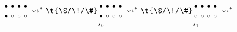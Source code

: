 \begin{primjer}
\begin{multline}
{\begin{array}{@{}c@{}}
    \text\textbullet\\
    \text\textbullet
    \end{array}}
    \begin{array}{@{}c@{}}
    \text\textbullet\\
    \text\textopenbullet
    \end{array}
    \begin{array}{@{}c@{}}
    \text\textbullet\\
    \text\textopenbullet
    \end{array}
    \begin{array}{@{}c@{}}
    \text\textbullet\\
    \text\textopenbullet
    \end{array}
        \leadsto^*
    \t{\$/\!/\#}
    \underset{\mathclap{s_0}}{\begin{array}{@{}c@{}}
    \text\textbullet\\
    \text\textbullet
    \end{array}}
    \begin{array}{@{}c@{}}
    \text\textbullet\\
    \text\textopenbullet
    \end{array}
    \begin{array}{@{}c@{}}
    \text\textbullet\\
    \text\textopenbullet
    \end{array}
    \begin{array}{@{}c@{}}
    \text\textbullet\\
    \text\textopenbullet
    \end{array}
        \leadsto^*
    \t{\$/\!/\#}
    \underset{\mathclap{s_1}}{\begin{array}{@{}c@{}}
    \text\textbullet\\
    \text\textopenbullet
    \end{array}}
    \begin{array}{@{}c@{}}
    \text\textbullet\\
    \text\textopenbullet
    \end{array}
    \begin{array}{@{}c@{}}
    \text\textbullet\\
    \text\textopenbullet
    \end{array}
    \begin{array}{@{}c@{}}
    \text\textbullet\\
    \text\textopenbullet
    \end{array}
        \leadsto^*

\end{multline}
\end{primjer}
